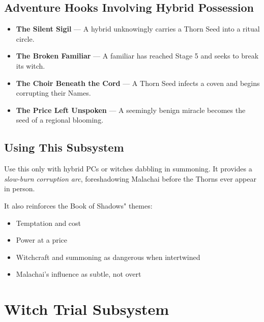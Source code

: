\documentclass[11pt]{book}
\begin{document}
\subsection*{Adventure Hooks Involving Hybrid Possession}
\begin{itemize}[leftmargin=1.5em]
    \item \textbf{The Silent Sigil} --- A hybrid unknowingly carries a Thorn Seed into a ritual circle.  
    \item \textbf{The Broken Familiar} --- A familiar has reached Stage 5 and seeks to break its witch.  
    \item \textbf{The Choir Beneath the Cord} --- A Thorn Seed infects a coven and begins corrupting their Names.  
    \item \textbf{The Price Left Unspoken} --- A seemingly benign miracle becomes the seed of a regional blooming.  
\end{itemize}

\subsection*{Using This Subsystem}
Use this only with hybrid PCs or witches dabbling in summoning.  
It provides a \emph{slow-burn corruption arc}, foreshadowing Malachai before the Thorns ever appear in person.

It also reinforces the Book of Shadows" themes:

\begin{itemize}[leftmargin=1.5em]
    \item Temptation and cost  
    \item Power at a price  
    \item Witchcraft and summoning as dangerous when intertwined  
    \item Malachai's influence as subtle, not overt  
\end{itemize}

\section*{Witch Trial Subsystem}
\end{document}
